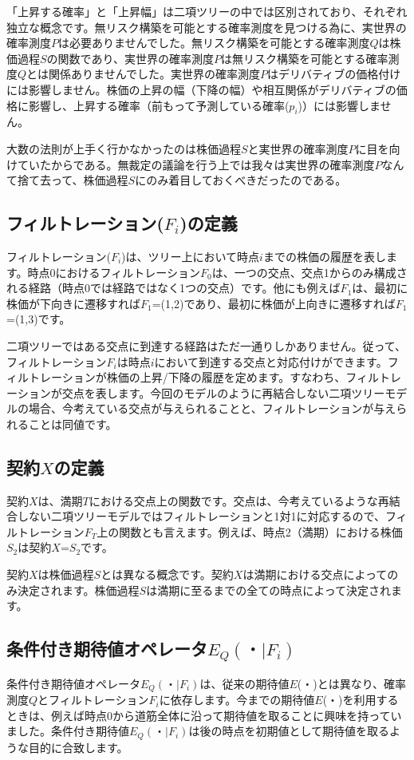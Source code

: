\documentclass[uplatex,a4j,12pt,dvipdfmx]{jsarticle}
\begin{document}
「上昇する確率」と「上昇幅」は二項ツリーの中では区別されており、それぞれ独立な概念です。無リスク構築を可能とする確率測度を見つける為に、実世界の確率測度$P$は必要ありませんでした。無リスク構築を可能とする確率測度$Q$は株価過程$S$の関数であり、実世界の確率測度$P$は無リスク構築を可能とする確率測度$Q$とは関係ありませんでした。実世界の確率測度$P$はデリバティブの価格付けには影響しません。株価の上昇の幅（下降の幅）や相互関係がデリバティブの価格に影響し、上昇する確率（前もって予測している確率($p_i$)）には影響しません。

大数の法則が上手く行かなかったのは株価過程$S$と実世界の確率測度$P$に目を向けていたからである。無裁定の議論を行う上では我々は実世界の確率測度$P$なんて捨て去って、株価過程$S$にのみ着目しておくべきだったのである。

\subsection{フィルトレーション($F_{i}$)の定義}
フィルトレーション($F_i$)は、ツリー上において時点$i$までの株価の履歴を表します。時点0におけるフィルトレーション$F_0$は、一つの交点、交点1からのみ構成される経路（時点0では経路ではなく1つの交点）です。他にも例えば$F_1$は、最初に株価が下向きに遷移すれば$F_1$=(1,2)であり、最初に株価が上向きに遷移すれば$F_1$=(1,3)です。

二項ツリーではある交点に到達する経路はただ一通りしかありません。従って、フィルトレーション$F_i$は時点$i$において到達する交点と対応付けができます。フィルトレーションが株価の上昇/下降の履歴を定めます。すなわち、フィルトレーションが交点を表します。今回のモデルのように再結合しない二項ツリーモデルの場合、今考えている交点が与えられることと、フィルトレーションが与えられることは同値です。

\subsection{契約$X$の定義}
契約$X$は、満期$T$における交点上の関数です。交点は、今考えているような再結合しない二項ツリーモデルではフィルトレーションと1対1に対応するので、フィルトレーション$F_T$上の関数とも言えます。例えば、時点2（満期）における株価$S_2$は契約$X$=$S_2$です。

契約$X$は株価過程$S$とは異なる概念です。契約$X$は満期における交点によってのみ決定されます。株価過程$S$は満期に至るまでの全ての時点によって決定されます。

\subsection{条件付き期待値オペレータ$E_Q(・|F_i)$}
条件付き期待値オペレータ$E_Q(・|F_i)$は、従来の期待値$E$(・)とは異なり、確率測度$Q$とフィルトレーション$F_i$に依存します。今までの期待値$E$(・)を利用するときは、例えば時点0から道筋全体に沿って期待値を取ることに興味を持っていました。条件付き期待値$E_Q(・|F_i)$は後の時点を初期値として期待値を取るような目的に合致します。
\end{document}

